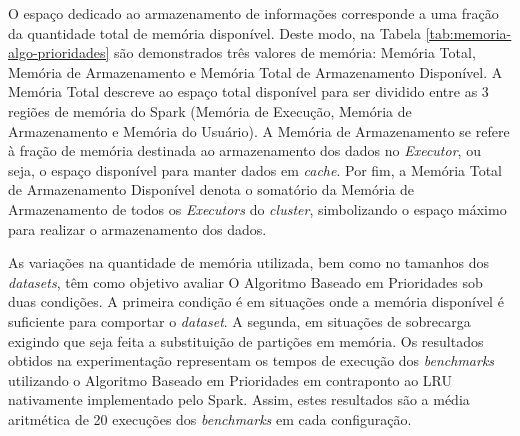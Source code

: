 O espaço dedicado ao armazenamento de informações corresponde a uma fração da quantidade total de memória disponível. Deste modo, na Tabela \ref{tab:memoria-algo-prioridades} são demonstrados três valores de memória: Memória Total, Memória de Armazenamento e Memória Total de Armazenamento Disponível. A Memória Total descreve ao espaço total disponível para ser dividido entre as 3 regiões de memória do Spark (Memória de Execução, Memória de Armazenamento e Memória do Usuário). A Memória de Armazenamento se refere à fração de memória destinada ao armazenamento dos dados no \textit{Executor}, ou seja, o espaço disponível para manter dados em \textit{cache}. Por fim, a Memória Total de Armazenamento Disponível denota o somatório da Memória de Armazenamento de todos os \textit{Executors} do \textit{cluster}, simbolizando o espaço máximo para realizar o armazenamento dos dados.

\begin{table}[!ht]
    \caption{Configuração de Memória Utilizada - Algoritmo Baseado em Prioridades}
    \label{tab:memoria-algo-prioridades}
    \centering
\end{table}

As variações na quantidade de memória utilizada, bem como no tamanhos dos \textit{datasets}, têm como objetivo avaliar O Algoritmo Baseado em Prioridades sob duas condições. A primeira condição é em situações onde a memória disponível é suficiente para comportar o \textit{dataset}. A segunda, em situações de sobrecarga exigindo que seja feita a substituição de partições em memória. Os resultados obtidos na experimentação representam os tempos de execução dos \textit{benchmarks} utilizando o Algoritmo Baseado em Prioridades em contraponto ao LRU nativamente implementado pelo Spark. Assim, estes resultados são a média aritmética de 20 execuções dos \textit{benchmarks} em cada configuração.

